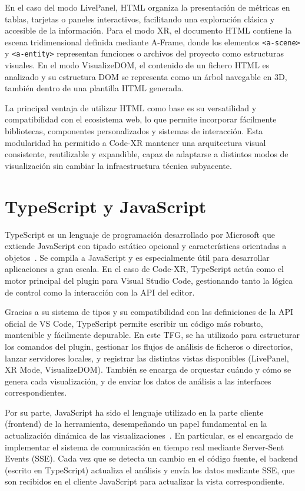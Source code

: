 \documentclass[a4paper, 12pt]{book}
\begin{document}
En el caso del modo LivePanel, HTML organiza la presentación de métricas en tablas, tarjetas o paneles interactivos, facilitando una exploración clásica y accesible de la información. Para el modo XR, el documento HTML contiene la escena tridimensional definida mediante A-Frame, donde los elementos \texttt{<a-scene>} y \texttt{<a-entity>} representan funciones o archivos del proyecto como estructuras visuales. En el modo VisualizeDOM, el contenido de un fichero HTML es analizado y su estructura DOM se representa como un árbol navegable en 3D, también dentro de una plantilla HTML generada.

La principal ventaja de utilizar HTML como base es su versatilidad y compatibilidad con el ecosistema web, lo que permite incorporar fácilmente bibliotecas, componentes personalizados y sistemas de interacción. Esta modularidad ha permitido a Code-XR mantener una arquitectura visual consistente, reutilizable y expandible, capaz de adaptarse a distintos modos de visualización sin cambiar la infraestructura técnica subyacente.

\section{TypeScript y JavaScript}
\label{sec:typescript-javascript}

TypeScript es un lenguaje de programación desarrollado por Microsoft que extiende JavaScript con tipado estático opcional y características orientadas a objetos~\cite{typescript}. Se compila a JavaScript y es especialmente útil para desarrollar aplicaciones a gran escala. En el caso de Code-XR, TypeScript actúa como el motor principal del plugin para Visual Studio Code, gestionando tanto la lógica de control como la interacción con la API del editor.

Gracias a su sistema de tipos y su compatibilidad con las definiciones de la API oficial de VS Code, TypeScript permite escribir un código más robusto, mantenible y fácilmente depurable. En este TFG, se ha utilizado para estructurar los comandos del plugin, gestionar los flujos de análisis de ficheros o directorios, lanzar servidores locales, y registrar las distintas vistas disponibles (LivePanel, XR Mode, VisualizeDOM). También se encarga de orquestar cuándo y cómo se genera cada visualización, y de enviar los datos de análisis a las interfaces correspondientes.

Por su parte, JavaScript ha sido el lenguaje utilizado en la parte cliente (frontend) de la herramienta, desempeñando un papel fundamental en la actualización dinámica de las visualizaciones~\cite{javascript}. En particular, es el encargado de implementar el sistema de comunicación en tiempo real mediante Server-Sent Events (SSE). Cada vez que se detecta un cambio en el código fuente, el backend (escrito en TypeScript) actualiza el análisis y envía los datos mediante SSE, que son recibidos en el cliente JavaScript para actualizar la vista correspondiente.
\end{document}
